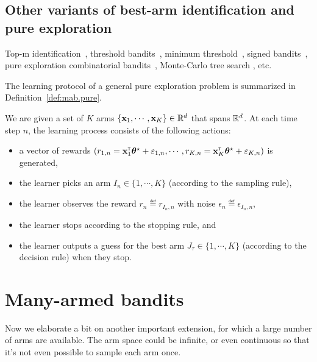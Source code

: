 \subsection{Other variants of best-arm identification and pure exploration}\label{sec:mab.extensions.other}

Top-m identification~\cite{kalyanakrishnan2010}, threshold bandits~\cite{locatelli2016thresholding}, minimum threshold~\cite{kaufmann2018murphy}, signed bandits~\cite{menard2019lma}, pure exploration combinatorial bandits~\cite{chen2014combinatorial}, Monte-Carlo tree search \cite{teraoka2014mc}, etc.

The learning protocol of a general pure exploration problem is summarized in Definition~\ref{def:mab.pure}.

\begin{definition}\label{def:mab.pure}
\begin{leftbar}[defnbar]
	We are given a set of $K$ arms $\{{\bf x}_1,\cdots,{\bf x}_K\}\in\mathbb{R}^d$ that spans $\mathbb{R}^d$. At each time step $n$, the learning process consists of the following actions:
\begin{itemize}
	\item a vector of rewards $(r_{1,n} = {\bf x}_1^\mathsf{\scriptscriptstyle T}{\boldsymbol \theta}^\star+\varepsilon_{1,n}, \cdots, r_{K,n} = {\bf x}_K^\mathsf{\scriptscriptstyle T}{\boldsymbol \theta}^\star+\varepsilon_{K,n})$ is generated,
	\item the learner picks an arm $I_n \in \{1,\cdots,K\}$ (according to the sampling rule),
	\item the learner observes the reward $r_n \eqdef r_{I_n, n}$ with noise $\epsilon_n \eqdef \epsilon_{I_n,n}$,
	\item the learner stops according to the stopping rule, and
	\item the learner outputs a guess for the best arm $J_\tau \in \{1,\cdots,K\}$ (according to the decision rule) when they stop.
\end{itemize}
\end{leftbar}
\end{definition}

\section{Many-armed bandits}\label{sec:mab.continuum}

Now we elaborate a bit on another important extension, for which a large number of arms are available. The arm space could be infinite, or even continuous so that it's not even possible to sample each arm once.

